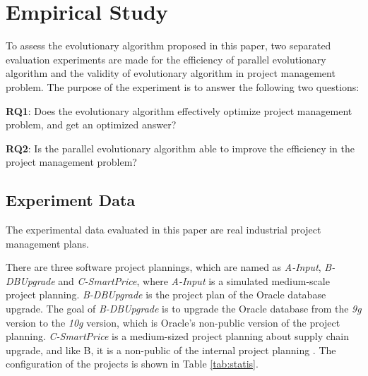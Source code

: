 %
%

\section{Empirical Study}
%
To assess the evolutionary algorithm proposed in this paper, two separated
evaluation experiments are made for the efficiency of parallel evolutionary
algorithm and the validity of evolutionary algorithm in project management
problem. The purpose of the experiment is to answer the following two questions:


\textbf{RQ1}: Does the evolutionary algorithm effectively optimize project
management problem, and get an optimized answer?

\textbf{RQ2}: Is the parallel evolutionary algorithm able to improve the
efficiency in the project management problem?


\subsection{Experiment Data}
%
The experimental data evaluated in this paper are real industrial project
management plans.


There are three software project plannings, which are named as \emph{A-Input},
\emph{B-DBUpgrade} and \emph{C-SmartPrice}, where \emph{A-Input} is a simulated
medium-scale project planning. \emph{B-DBUpgrade} is the project plan of the
Oracle database upgrade. The goal of \emph{B-DBUpgrade} is to upgrade the Oracle
database from the \emph{9g} version to the \emph{10g} version, which is Oracle's
non-public version of the project planning. \emph{C-SmartPrice} is a
medium-sized project planning about supply chain upgrade, and like B, it is a
non-public of the internal project planning \cite{ren}. The configuration of the
projects is shown in Table \ref{tab:statis}.

